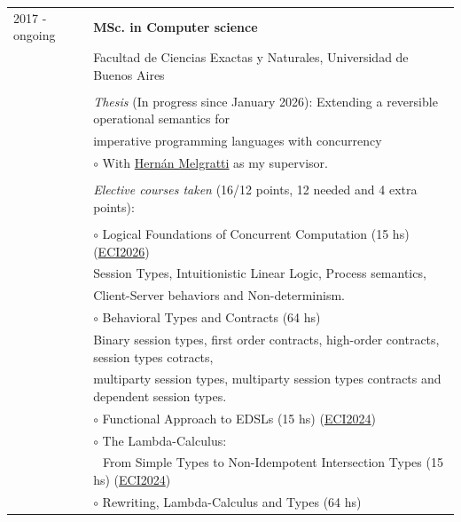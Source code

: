 \documentclass{article}
\newcommand{\shade}[1]{\textcolor{myGray}{#1}}
\begin{document}
\begin{longtable}{l l}
    2017 - ongoing  & \textbf{MSc. in Computer science}\\
                  & Facultad de Ciencias Exactas y Naturales, Universidad de Buenos Aires \\
					\\
                    & \textit{Thesis} \shade{(In progress since January 2026)}: Extending a reversible operational semantics for \\
                    & imperative programming languages with concurrency \\
                    & \indent $\circ$ With \href{https://dblp.org/pid/24/2104.html}{Hernán Melgratti} as my supervisor. \\
					\\
                    & \textit{Elective courses taken\footnotemark[1]} (16/12 points, 12 needed and 4 extra points): \\
                    \\
                    & $\circ$ Logical Foundations of Concurrent Computation \shade{(15 hs)} \hfill \shade{(\href{https://eci.dc.uba.ar/cursos-eci/}{ECI2026})} \\
                    & \indent \shade{Session Types, Intuitionistic Linear Logic, Process semantics,} \\
                    & \indent \shade{ Client-Server behaviors and Non-determinism.} \\
                    & $\circ$ Behavioral Types and Contracts \shade{(64 hs)} \\
                    & \indent \shade{Binary session types, first order contracts, high-order contracts, session types cotracts,} \\
                    & \indent \shade{multiparty session types, multiparty session types contracts and dependent session types.} \\
                    & $\circ$ Functional Approach to EDSLs \shade{(15 hs)} \hfill \shade{(\href{https://eci.dc.uba.ar/ecis-anteriores/eci2024/}{ECI2024})} \\
                    & $\circ$ The Lambda-Calculus: \\
                    & $~~$ From Simple Types to Non-Idempotent Intersection Types \shade{(15 hs)} \hfill \shade{(\href{https://eci.dc.uba.ar/ecis-anteriores/eci2024/}{ECI2024})} \\
                    & $\circ$ Rewriting, Lambda-Calculus and Types \shade{(64 hs)} \\

\end{longtable}
\end{document}
